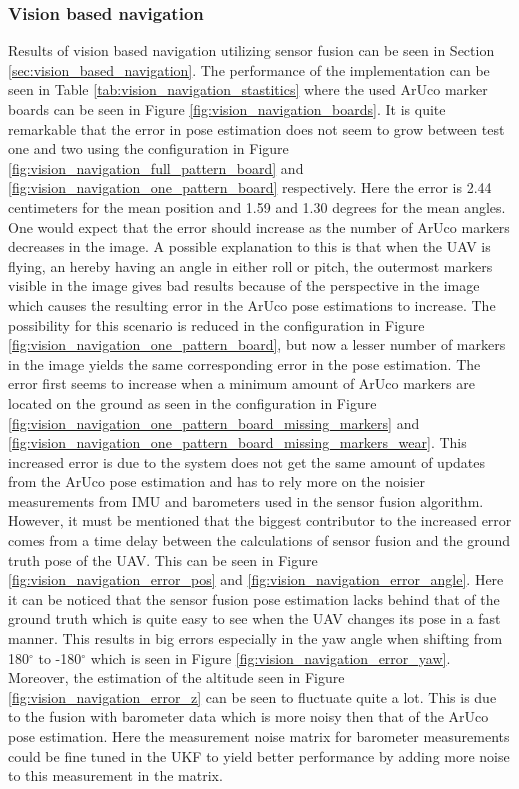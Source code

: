 \documentclass[../Head/report.tex]{subfiles}
\begin{document}
\subsubsection*{Vision based navigation}
Results of vision based navigation utilizing sensor fusion can be seen in Section \ref{sec:vision_based_navigation}. The performance of the implementation can be seen in Table \ref{tab:vision_navigation_stastitics} where the used ArUco marker boards can be seen in Figure \ref{fig:vision_navigation_boards}. It is quite remarkable that the error in pose estimation does not seem to grow between test one and two using the configuration in Figure \ref{fig:vision_navigation_full_pattern_board} and \ref{fig:vision_navigation_one_pattern_board} respectively. Here the error is 2.44 centimeters for the mean position and 1.59 and 1.30 degrees for the mean angles. One would expect that the error should increase as the number of ArUco markers decreases in the image. A possible explanation to this is that when the UAV is flying, an hereby having an angle in either roll or pitch, the outermost markers visible in the image gives bad results because of the perspective in the image which causes the resulting error in the ArUco pose estimations to increase. The possibility for this scenario is reduced in the configuration in Figure \ref{fig:vision_navigation_one_pattern_board}, but now a lesser number of markers in the image yields the same corresponding error in the pose estimation. The error first seems to increase when a minimum amount of ArUco markers are located on the ground as seen in the configuration in Figure \ref{fig:vision_navigation_one_pattern_board_missing_markers} and \ref{fig:vision_navigation_one_pattern_board_missing_markers_wear}. This increased error is due to the system does not get the same amount of updates from the ArUco pose estimation and has to rely more on the noisier measurements from IMU and barometers used in the sensor fusion algorithm. However, it must be mentioned that the biggest contributor to the increased error comes from a time delay between the calculations of sensor fusion and the ground truth pose of the UAV. This can be seen in Figure \ref{fig:vision_navigation_error_pos} and \ref{fig:vision_navigation_error_angle}. Here it can be noticed that the sensor fusion pose estimation lacks behind that of the ground truth which is quite easy to see when the UAV changes its pose in a fast manner. This results in big errors especially in the yaw angle when shifting from 180$^{\circ}$ to -180$^{\circ}$ which is seen in Figure \ref{fig:vision_navigation_error_yaw}. Moreover, the estimation of the altitude seen in Figure \ref{fig:vision_navigation_error_z} can be seen to fluctuate quite a lot. This is due to the fusion with barometer data which is more noisy then that of the ArUco pose estimation. Here the measurement noise matrix for barometer measurements could be fine tuned in the UKF to yield better performance by adding more noise to this measurement in the matrix. 
\end{document}
